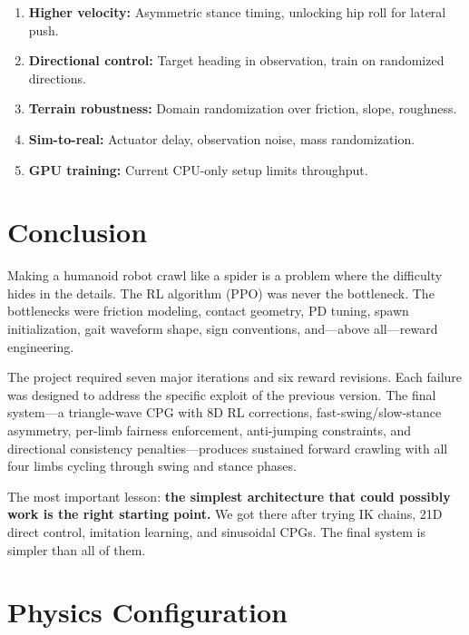 \documentclass[11pt, a4paper]{article}
\begin{document}
\begin{enumerate}[nosep]
\item \textbf{Higher velocity:} Asymmetric stance timing, unlocking hip roll for lateral push.
\item \textbf{Directional control:} Target heading in observation, train on randomized directions.
\item \textbf{Terrain robustness:} Domain randomization over friction, slope, roughness.
\item \textbf{Sim-to-real:} Actuator delay, observation noise, mass randomization.
\item \textbf{GPU training:} Current CPU-only setup limits throughput.
\end{enumerate}

\section{Conclusion}

Making a humanoid robot crawl like a spider is a problem where the difficulty hides in the details. The RL algorithm (PPO) was never the bottleneck. The bottlenecks were friction modeling, contact geometry, PD tuning, spawn initialization, gait waveform shape, sign conventions, and---above all---reward engineering.

The project required seven major iterations and six reward revisions. Each failure was designed to address the specific exploit of the previous version. The final system---a triangle-wave CPG with 8D RL corrections, fast-swing/slow-stance asymmetry, per-limb fairness enforcement, anti-jumping constraints, and directional consistency penalties---produces sustained forward crawling with all four limbs cycling through swing and stance phases.

The most important lesson: \textbf{the simplest architecture that could possibly work is the right starting point.} We got there after trying IK chains, 21D direct control, imitation learning, and sinusoidal CPGs. The final system is simpler than all of them.

\appendix
\section{Physics Configuration}
\end{document}

